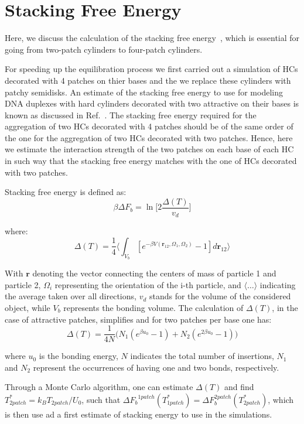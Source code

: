 \documentclass[aip,jcp, amsmath, amssymb, reprint]{revtex4-1}
\begin{document}
\section{Stacking Free Energy}\label{app:freeenergy}

Here, we discuss the calculation of the stacking free energy~\cite{DeMichele12}, which is essential for going from two-patch cylinders to four-patch cylinders. 

For speeding up the equilibration process we first carried out a simulation of HCs decorated with 4 patches on thier
bases and the we replace these cylinders with patchy semidisks. An estimate of the stacking free energy to use for
modeling DNA duplexes with hard cylinders  decorated with two attractive on their bases is known as discussed in
Ref.~\cite{DeMichele12}. The stacking free energy required for the aggregation of two HCs decorated with 4 patches
should be of the same order of the one for the aggregation of two HCs decorated with two patches. Hence, here we
estimate the interaction strength of the two patches on each base of each HC in such way that the stacking free energy
matches with the one of HCs decorated with two patches.


Stacking free energy is defined as:
\begin{equation}
	\beta\Delta F_b=\ln \bigg[2\frac{\Delta(T)}{v_d}\bigg]
	\label{deltaf}
\end{equation}

where:
\begin{equation}
\label{deltat}
	\Delta(T)=\frac{1}{4}\bigg\langle \int_{V_b} [e^{-\beta V(\textbf{r}_{12}, \Omega_1, \Omega_2)}-1]d\textbf{r}_{12}\bigg\rangle
\end{equation}

With $\textbf{r}$ denoting the vector connecting the centers of mass of particle 1 and particle 2, $\Omega_i$
representing the orientation of the i-th particle, and $\langle\ldots\rangle$ indicating the average taken over all
directions, $v_d$ stands for the volume of the considered object, while $V_b$ represents the bonding volume. The
calculation of $\Delta (T)$, in the case of attractive patches, simplifies and for two patches per base one has: 
\begin{equation}
\label{deltat2}
	\Delta(T)=\frac{1}{4N}\big( N_1(e^{\beta u_0}-1)+N_2(e^{2\beta u_0}-1)\big)
\end{equation}

where $u_0$ is the bonding energy, $N$ indicates the total number of insertions, $N_1$ and $N_2$ represent the occurrences of having one and two
bonds, respectively. 

Through a Monte Carlo algorithm, one can estimate $\Delta(T)$ and find $T^*_{2 patch}=k_B T_{2 patch}/U_0$, such that ${\Delta F_b}^{1 patch}(T^*_{1 patch})=\Delta F_b^{2 patch}(T^*_{2 patch})$, 
which is then use ad a first estimate of stacking energy to use in the simulations.



\end{document}
